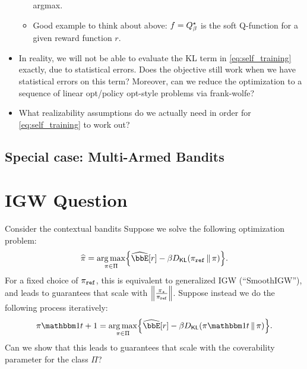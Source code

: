 \documentclass{article}
\begin{document}
\begin{itemize}
\begin{itemize}
    argmax.
  \item Good example to think about above: $f=\Qstarb$ is the soft
    Q-function for a given reward function $r$.
  \end{itemize}
\item In reality, we will not be able to evaluate the KL term in
  \cref{eq:self_training} exactly, due to statistical errors. Does the
  objective still work when we have statistical errors on this term?
  Moreover, can we reduce the optimization to a sequence of linear
  opt/policy opt-style problems via frank-wolfe?
\item What realizability assumptions do we actually need in order for
  \cref{eq:self_training} to work out?
\end{itemize}

\subsection{Special case: Multi-Armed Bandits}

\section{IGW Question}
Consider the contextual bandits
Suppose we solve the following optimization problem:
\[
  \pihat=\argmax_{\pi\in\Pi}\crl*{
    \Eh\brk*{r} - \beta\Dkl{\piref}{\pi}}.
\]
For a fixed choice of $\piref$, this is equivalent to generalized IGW
(``SmoothIGW''), and leads to guarantees that scale with
$\nrm*{\frac{\pistar}{\piref}}$. Suppose instead we do the following
process iteratively:
\[
  \pi\ind{t+1}=\argmax_{\pi\in\Pi}\crl*{
    \Eh\brk*{r} - \beta\Dkl{\pi\ind{t}}{\pi}}.
\]
Can we show that this leads to guarantees that scale with the
coverability parameter for the class $\Pi$?


 
\end{document}
